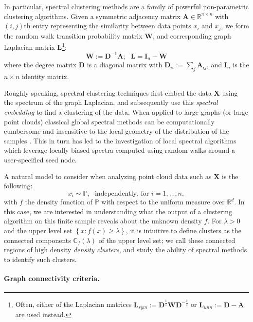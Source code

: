 \documentclass{article}
\newcommand{\set}[1]{\left\{#1\right\}}
\newcommand{\Reals}{\mathbb{R}}
\newcommand{\Rd}{\Reals^d}
\newcommand{\1}{\mathbf{1}}
\newcommand{\Abf}{\mathbf{A}}
\newcommand{\Xbf}{\mathbf{X}}
\newcommand{\Wbf}{\mathbf{W}}
\newcommand{\Lbf}{\mathbf{L}}
\newcommand{\Dbf}{\mathbf{D}}
\newcommand{\Ibf}[1]{\mathbf{I}_{#1}}
\newcommand{\Pbb}{\mathbb{P}}
\theoremstyle{aldenthm}
\theoremstyle{remark}
\begin{document}
In particular, spectral clustering methods are a family of powerful non-parametric clustering algorithms. Given a symmetric adjacency matrix $\Abf \in \Reals^{n \times n}$ with $(i,j)$th entry representing the similarity between data points $x_i$ and $x_j$, we form the random walk transition probability matrix $\Wbf$, and corresponding graph Laplacian matrix $\Lbf$\footnote{Often, either of the Laplacian matrices  $\Lbf_{sym} := \Dbf^{\frac{1}{2}}\Wbf \Dbf^{-\frac{1}{2}}$ or $\Lbf_{unn} := \Dbf - \Abf$ are used instead.}:
\begin{equation}
\label{eqn: random_walk_laplacian}
\Wbf := \Dbf^{-1}\Abf; ~~~ \Lbf = \Ibf{n} - \Wbf
\end{equation}
where the degree matrix $\Dbf$ is a diagonal matrix with $\Dbf_{ii} := \sum_j \Abf_{ij}$, and $\Ibf{n}$ is the $n \times n$ identity matrix.

Roughly speaking, spectral clustering techniques first embed the data $\Xbf$ using the spectrum of the graph Laplacian, and subsequently 
use this \emph{spectral embedding} to find a clustering of the data.
When applied to large graphs (or large point clouds) classical global spectral 
methods can be computationally cumbersome and 
insensitive to the local geometry of the distribution of the samples
\citep{mahoney2012,leskovec2010}.
This in turn has led to the investigation of local spectral algorithms \citep{spielman2013,anderson2006,leskovec2010}
which leverage locally-biased spectra computed using random walks around 
a user-specified seed node. 

A natural model to consider when analyzing point cloud data such as $\Xbf$ is the following:
\begin{equation}
x_i \sim \Pbb, ~~~ \text{independently, for $i = 1,\ldots,n$},
\end{equation} 
with $f$ the density function of $\Pbb$ with respect to the uniform measure over $\Rd$. In this case, we are interested in understanding what the output of a clustering algorithm on this finite sample reveals about the unknown density $f$. For $\lambda > 0$ and the upper level set $\set{x: f(x) \geq \lambda}$, it is intuitive \cite{hartigan1981,chaudhuri2010} to define clusters as the connected components $\mathbb{C}_f(\lambda)$ of the upper level set; we call these connected regions of high density \textit{density clusters}, and study the ability of spectral methods to identify such clusters. 

\paragraph{Graph connectivity criteria.}
\end{document}
